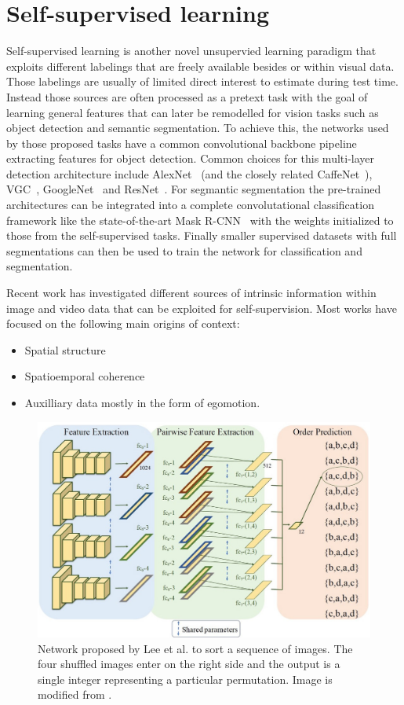 \section{Self-supervised learning}
Self-supervised learning is another novel unsupervied learning paradigm that exploits different labelings that are freely available besides or within visual data. Those labelings are usually of limited direct interest to estimate during test time. Instead those sources are often processed as a pretext task with the goal of learning general features that can later be remodelled for vision tasks such as object detection and semantic segmentation\needref. To achieve this, the networks used by those proposed tasks have a common convolutional backbone pipeline extracting features for object detection. Common choices for this multi-layer detection architecture include AlexNet~\cite{krizhevsky2012} (and the closely related CaffeNet~\cite{jia2014}), VGC~\cite{simonyan2014}, GoogleNet~\cite{szegedy2015} and ResNet~\cite{he2016}. For segmantic segmentation the pre-trained architectures can be integrated into a complete convolutational classification framework like the state-of-the-art Mask R-CNN~\cite{he2017} with the weights initialized to those from the self-supervised tasks. Finally smaller supervised datasets with full segmentations can then be used to train the network for classification and segmentation.

Recent work has investigated different sources of intrinsic information within image and video data that can be exploited for self-supervision. Most works have focused on the following main origins of context: 
\begin{itemize}
\item Spatial structure
\item Spatioemporal coherence 
\item Auxilliary data mostly in the form of egomotion.
\end{itemize}

\begin{figure}[t]
\centering
\includegraphics[width=\textwidth]{images/sorting_sequences.jpg}
\caption{Network proposed by Lee et al.\cite{lee2017} to sort a sequence of images. The four shuffled images enter on the right side and the output is a single integer representing a particular permutation. Image is modified from \cite{lee2017}.}
\label{fig:sorting_sequence}
\end{figure}


